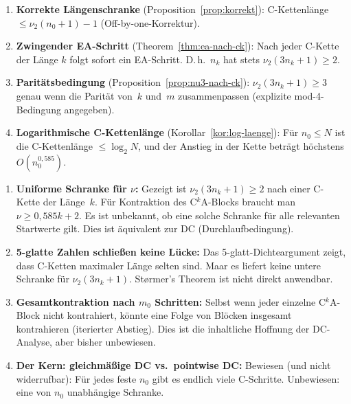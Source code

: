 \documentclass[12pt,a4paper]{article}
\newcommand{\vii}{\nu_2}
\begin{document}
\begin{tcolorbox}[ergebnis, title={Bewiesene neue Ergebnisse dieses Dokuments}]
\begin{enumerate}[label=(\arabic*)]
  \item \textbf{Korrekte Längenschranke} (Proposition~\ref{prop:korrekt}):
    C-Kettenlänge $\leq \vii(n_0+1) - 1$ (Off-by-one-Korrektur).

  \item \textbf{Zwingender EA-Schritt} (Theorem~\ref{thm:ea-nach-ck}):
    Nach jeder C-Kette der Länge $k$ folgt sofort ein EA-Schritt.
    D.\,h.\ $n_k$ hat stets $\vii(3n_k+1) \geq 2$.

  \item \textbf{Paritätsbedingung} (Proposition~\ref{prop:nu3-nach-ck}):
    $\vii(3n_k+1) \geq 3$ genau wenn die Parität von~$k$ und~$m$ zusammenpassen
    (explizite mod-4-Bedingung angegeben).

  \item \textbf{Logarithmische C-Kettenlänge} (Korollar~\ref{kor:log-laenge}):
    Für $n_0 \leq N$ ist die C-Kettenlänge $\leq \log_2 N$, und der Anstieg
    in der Kette beträgt höchstens $O(n_0^{0{,}585})$.
\end{enumerate}
\end{tcolorbox}

\begin{tcolorbox}[lücke, title={Offene Fragen --- präzise benannt}]
\begin{enumerate}[label=(\arabic*)]
  \item \textbf{Uniforme Schranke für $\nu$:}
    Gezeigt ist $\vii(3n_k+1) \geq 2$ nach einer C-Kette der Länge~$k$.
    Für Kontraktion des C$^k$A-Blocks braucht man $\nu \geq 0{,}585k + 2$.
    Es ist unbekannt, ob eine solche Schranke für alle relevanten Startwerte
    gilt. Dies ist äquivalent zur DC (Durchlaufbedingung).

  \item \textbf{5-glatte Zahlen schließen keine Lücke:}
    Das 5-glatt-Dichteargument zeigt, dass C-Ketten maximaler Länge selten sind.
    Maar es liefert keine untere Schranke für $\vii(3n_k+1)$.
    Størmer's Theorem ist nicht direkt anwendbar.

  \item \textbf{Gesamtkontraktion nach $m_0$ Schritten:}
    Selbst wenn jeder einzelne C$^k$A-Block nicht kontrahiert, könnte eine
    Folge von Blöcken insgesamt kontrahieren (iterierter Abstieg).
    Dies ist die inhaltliche Hoffnung der DC-Analyse, aber bisher unbewiesen.

  \item \textbf{Der Kern: gleichmäßige DC vs.\ pointwise DC:}
    Bewiesen (und nicht widerrufbar): Für jedes feste $n_0$ gibt es endlich
    viele C-Schritte. Unbewiesen: eine von $n_0$ unabhängige Schranke.
\end{enumerate}
\end{tcolorbox}
\end{document}
